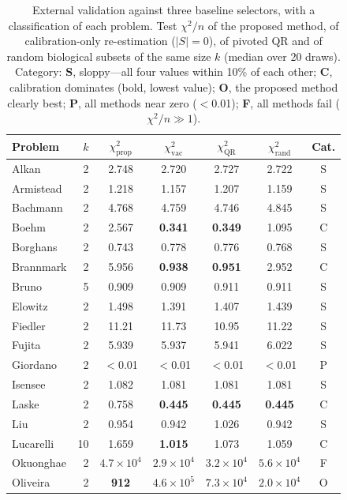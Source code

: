 \begin{table}[H]
\caption{External validation against three baseline selectors, with a classification of each problem. Test $\chi^2/n$ of the proposed method, of calibration-only re-estimation ($|S|=0$), of pivoted QR and of random biological subsets of the same size $k$ (median over 20 draws). Category: \textbf{S}, sloppy---all four values within 10\% of each other; \textbf{C}, calibration dominates (bold, lowest value); \textbf{O}, the proposed method clearly best; \textbf{P}, all methods near zero ($<$0.01); \textbf{F}, all methods fail ($\chi^2/n\gg1$).}
\label{tab:controls}
\centering
\small
\begin{tabular}{@{}lrccccc@{}}
\toprule
Problem & $k$ & $\chi^2_{\mathrm{prop}}$ & $\chi^2_{\mathrm{vac}}$ & $\chi^2_{\mathrm{QR}}$ & $\chi^2_{\mathrm{rand}}$ & Cat. \\
\midrule
Alkan        & 2  & 2.748 & 2.720 & 2.727 & 2.722 & S \\
Armistead    & 2  & 1.218 & 1.157 & 1.207 & 1.159 & S \\
Bachmann     & 2  & 4.768 & 4.759 & 4.746 & 4.845 & S \\
Boehm        & 2  & 2.567 & \textbf{0.341} & \textbf{0.349} & 1.095 & C \\
Borghans     & 2  & 0.743 & 0.778 & 0.776 & 0.768 & S \\
Brannmark    & 2  & 5.956 & \textbf{0.938} & \textbf{0.951} & 2.952 & C \\
Bruno        & 5  & 0.909 & 0.909 & 0.911 & 0.911 & S \\
Elowitz      & 2  & 1.498 & 1.391 & 1.407 & 1.439 & S \\
Fiedler      & 2  & 11.21 & 11.73 & 10.95 & 11.22 & S \\
Fujita       & 2  & 5.939 & 5.937 & 5.941 & 6.022 & S \\
Giordano     & 2  & $<$0.01 & $<$0.01 & $<$0.01 & $<$0.01 & P \\
Isensee      & 2  & 1.082 & 1.081 & 1.081 & 1.081 & S \\
Laske        & 2  & 0.758 & \textbf{0.445} & \textbf{0.445} & \textbf{0.445} & C \\
Liu          & 2  & 0.954 & 0.942 & 1.026 & 0.942 & S \\
Lucarelli    & 10 & 1.659 & \textbf{1.015} & 1.073 & 1.059 & C \\
Okuonghae    & 2  & $4.7\times10^4$ & $2.9\times10^4$ & $3.2\times10^4$ & $5.6\times10^4$ & F \\
Oliveira     & 2  & \textbf{912} & $4.6\times10^5$ & $7.3\times10^4$ & $2.0\times10^4$ & O \\

\end{tabular}
\end{table}
